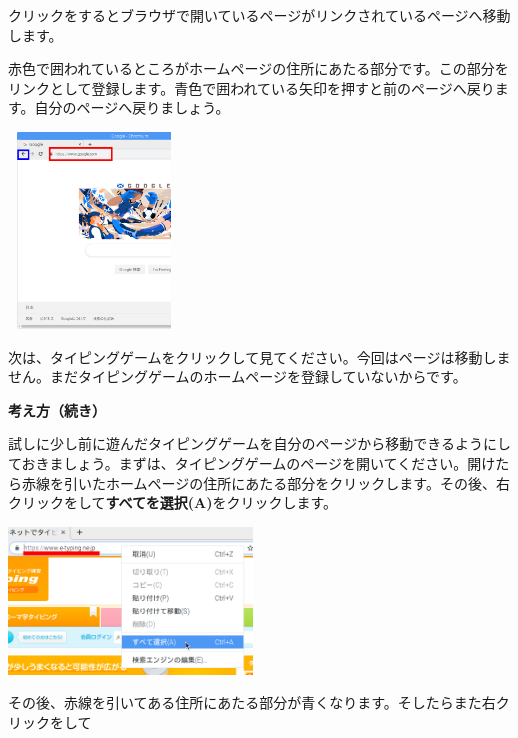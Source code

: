 \documentclass[a4paper,12pt]{jarticle}
\begin{document}
\flushleft

\bigskip

クリックをするとブラウザで開いているページがリンクされているページへ移動します。

赤色で囲われているところがホームページの住所にあたる部分です。この部分をリンクとして登録します。青色で囲われている矢印を押すと前のページへ戻ります。自分のページへ戻りましょう。



\bigskip

\centering
\includegraphics[width=4.547cm,height=5.216cm]{textbook-img195.png}

\bigskip

\flushleft
次は、タイピングゲームをクリックして見てください。今回はページは移動しません。まだタイピングゲームのホームページを登録していないからです。


\clearpage
\textbf{考え方（続き）}



試しに少し前に遊んだタイピングゲームを自分のページから移動できるようにしておきましょう。まずは、タイピングゲームのページを開いてください。開けたら赤線を引いたホームページの住所にあたる部分をクリックします。その後、右クリックをして\textbf{すべてを選択(A)}をクリックします。


\bigskip

\centering
\includegraphics[width=6.495cm,height=3.914cm]{textbook-img196.png}

\flushleft

その後、赤線を引いてある住所にあたる部分が青くなります。そしたらまた右クリックをして
\end{document}
